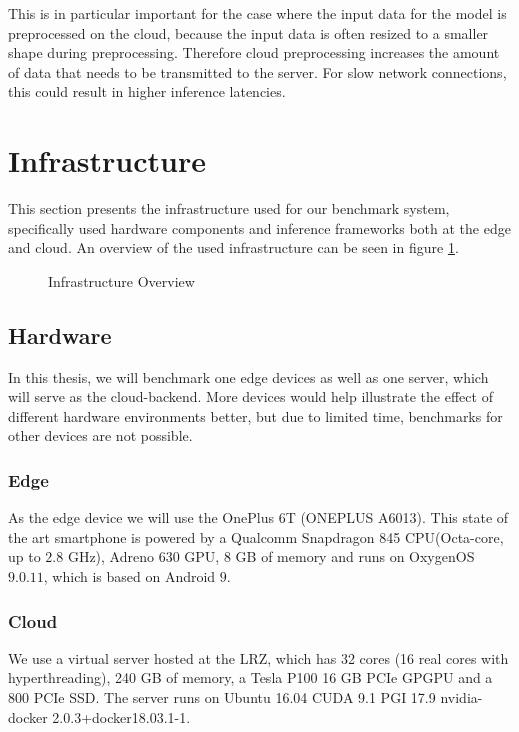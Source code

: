 This is in particular important for the case where the input data for the model is preprocessed on the cloud, because the input data is often resized to a smaller shape during preprocessing. Therefore cloud preprocessing increases the amount of data that needs to be transmitted to the server. For slow network connections, this could result in higher inference latencies.





\section{Infrastructure}
\label{chap:infrastructure}
This section presents the infrastructure used for our benchmark system, specifically used hardware components and inference frameworks both at the edge and cloud.
An overview of the used infrastructure can be seen in figure \ref{fig:expDesign}.

\begin{figure}[H]
\centering
\resizebox{.95\linewidth}{!}{}
\caption{Infrastructure Overview}
\label{fig:expDesign}
\end{figure}


\subsection{Hardware}
In this thesis, we will benchmark one edge devices as well as one server, which will serve as the cloud-backend.
More devices would help illustrate the effect of different hardware environments better, but due to limited time, benchmarks for other devices are not possible.
\subsubsection{Edge}
\label{chap:hardwareEdge}
As the edge device we will use the OnePlus 6T (ONEPLUS A6013). This state of the art smartphone is powered by a Qualcomm Snapdragon 845 CPU(Octa-core, up to $2.8$ GHz), Adreno $630$ GPU, $8$ GB of memory and runs on OxygenOS $9.0.11$, which is based on Android $9$.
\subsubsection{Cloud}
We use a virtual server hosted at the LRZ, which has 32 cores (16 real cores with hyperthreading), 240 GB of memory, a Tesla P100 16 GB PCIe GPGPU and a 800 PCIe SSD.
The server runs on Ubuntu 16.04 CUDA 9.1 PGI 17.9 nvidia-docker 2.0.3+docker18.03.1-1.
